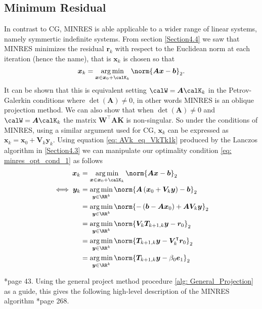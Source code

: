 \subsection{Minimum Residual}\label{Section4.6}
In contrast to CG, MINRES is able applicable to a wider range of linear systems, namely symmertic indefinite systems. From section \ref{Section4.4} we saw that MINRES minimizes the residual $\bm{r}_k$ with respect to the Euclidean norm at each iteration (hence the name), that is $\bm{x}_k$ is chosen so that
\begin{equation} \label{eq: minres_opt_cond_1}
    \bm{x}_k = \argmin_{\bm{x} \in \bm{x}_0 + \calK_k} \norm{\bm{A} \bm {x} - \bm{b}}_2.
\end{equation}
It can be shown that this is equivalent setting $\calW = \bm{A} \calK_k$ in the Petrov-Galerkin conditions where $\det \left( \bm{A} \right) \neq 0$, in other words MINRES is an oblique projection method. We can also show that when $\det \left( \bm{A} \right) \neq 0$ and $\calW = \bm{A} \calK_k$ the matrix $\bm{W}^{\intercal} \bm{A} \bm{K}$ is non-singular. So under the conditions of MINRES, using a similar argument used for CG, $\bm{x}_k$ can be expressed as $\bm{x}_k = \bm{x}_0 + \bm{V}_k \bm{y}_k$. Using equation \ref{eq: AVk_eq_VkTk1k} produced by the Lanczos algorithm in \ref{Section4.3} we can manipulate our optimality condition \ref{eq: minres_opt_cond_1} as follows
\begin{align*}
    \bm{x}_k      & = \argmin_{\bm{x} \in \bm{x}_0 + \calK_k} \norm{\bm{A} \bm {x} - \bm{b}}_2                                 \\
    \iff \bm{y}_k & = \argmin_{\bm{y} \in \RR^k} \norm{\bm{A} \left( \bm{x}_0 + \bm{V}_k \bm{y} \right) - \bm{b}}_2            \\
                  & = \argmin_{\bm{y} \in \RR^k} \norm{ - \left( \bm{b} - \bm{A} \bm{x}_0 \right) + \bm{A} \bm{V}_k \bm{y} }_2 \\
                  & = \argmin_{\bm{y} \in \RR^k} \norm{ \bm{V}_{k} \bm{T}_{k+1,k} \bm{y} - \bm{r}_0 }_2                        \\
                  & = \argmin_{\bm{y} \in \RR^k} \norm{ \bm{T}_{k+1,k} \bm{y} - \bm{V}_{k}^{\intercal} \bm{r}_0 }_2            \\
                  & = \argmin_{\bm{y} \in \RR^k} \norm{ \bm{T}_{k+1,k} \bm{y} - \beta_0 \bm{e}_1 }_2
\end{align*}

\cite{GreenbaumAnne1997Imfs}*{page 43}. Using the general project method procedure \ref{alg: General_Projection} as a guide, this gives the following high-level description of the MINRES algorithm \cite{TrefethenLloydN.LloydNicholas1997Nla/}*{page 268}.

